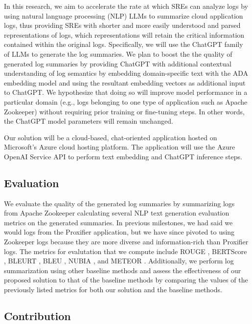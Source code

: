\documentclass[conference]{IEEEtran}
\begin{document}
In this research, we aim to accelerate the rate at which SREs can analyze logs by using natural language processing (NLP) LLMs to summarize cloud application logs, thus providing SREs with shorter and more easily understood and parsed representations of logs, which representations will retain the critical information contained within the original logs. \cite{medium-text-summarization} Specifically, we will use the ChatGPT family of LLMs to generate the log summaries. We plan to boost the the quality of generated log summaries by providing ChatGPT with additional contextual understanding of log semantics by embedding domain-specific text with the ADA embedding model and using the resultant embedding vectors as additional input to ChatGPT. We hypothesize that doing so will improve model performance in a particular domain (e.g., logs belonging to one type of application such as Apache Zookeeper) without requiring prior training or fine-tuning steps. In other words, the ChatGPT model parameters will remain unchanged.

Our solution will be a cloud-based, chat-oriented application hosted on Microsoft's Azure cloud hosting platform. The application will use the Azure OpenAI Service API to perform text embedding and ChatGPT inference steps.

\subsection{Evaluation}


We evaluate the quality of the generated log summaries by summarizing logs from Apache Zookeeper \cite{zookeeper} calculating several NLP text generation evaluation metrics on the generated summaries. In previous milestones, we had said we would logs from the Proxifier \cite{proxifier} application, but we have since pivoted to using Zookeeper logs because they are more diverse and information-rich than Proxifier logs. The metrics for evalutation that we compute include ROUGE \cite{lin2004rouge}, BERTScore \cite{bert-score}, BLEURT \cite{sellam2020bleurt}, BLEU \cite{10.3115/1073083.1073135}, NUBIA \cite{kane2020nubia}, and METEOR \cite{banerjee-lavie-2005-meteor}. Additionally, we perform log summarization using other baseline methods and assess the effectiveness of our proposed solution to that of the baseline methods by comparing the values of the previously listed metrics for both our solution and the baseline methods.

\subsection{Contribution}
\end{document}
